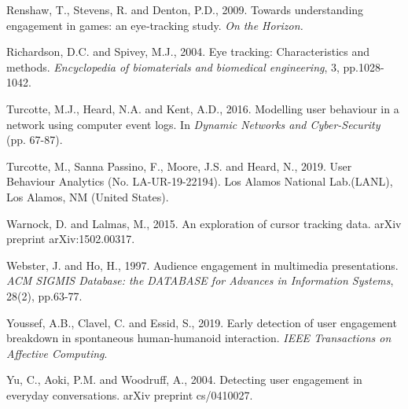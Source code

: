 \documentclass[12pt]{article}
\renewcommand{\_}{\kern-1.5pt\textunderscore\kern-1.5pt}
\begin{document}
\vspace{\baselineskip}
Renshaw, T., Stevens, R. and Denton, P.D., 2009. Towards understanding engagement in games: an eye‐tracking study. \textit{On the Horizon.}\par


\vspace{\baselineskip}
Richardson, D.C. and Spivey, M.J., 2004. Eye tracking: Characteristics and methods. \textit{Encyclopedia of biomaterials and biomedical engineering}, 3, pp.1028-1042.\par


\vspace{\baselineskip}
Turcotte, M.J., Heard, N.A. and Kent, A.D., 2016. Modelling user behaviour in a network using computer event logs. In \textit{Dynamic Networks and Cyber-Security} (pp. 67-87).\par


\vspace{\baselineskip}
Turcotte, M., Sanna Passino, F., Moore, J.S. and Heard, N., 2019. User Behaviour Analytics (No. LA-UR-19-22194). Los Alamos National Lab.(LANL), Los Alamos, NM (United States).\par


\vspace{\baselineskip}
Warnock, D. and Lalmas, M., 2015. An exploration of cursor tracking data. arXiv preprint arXiv:1502.00317.\par


\vspace{\baselineskip}
Webster, J. and Ho, H., 1997. Audience engagement in multimedia presentations. \textit{ACM SIGMIS Database: the DATABASE for Advances in Information Systems}, 28(2), pp.63-77.\par


\vspace{\baselineskip}
Youssef, A.B., Clavel, C. and Essid, S., 2019. Early detection of user engagement breakdown in spontaneous human-humanoid interaction. \textit{IEEE Transactions on Affective Computing}.\par


\vspace{\baselineskip}
Yu, C., Aoki, P.M. and Woodruff, A., 2004. Detecting user engagement in everyday conversations. arXiv preprint cs/0410027.\par

\printbibliography
\end{document}
